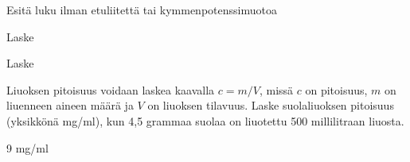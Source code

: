 \begin{tehtavasivu}

\begin{tehtava}
Esitä luku ilman etuliitettä tai kymmenpotenssimuotoa
\begin{alakohdat}
\end{alakohdat}
\begin{vastaus}
\begin{alakohdat}
\end{alakohdat}
\end{vastaus}
\end{tehtava}

\begin{tehtava}
Laske
\begin{alakohdat}
\end{alakohdat}
\begin{vastaus}
\begin{alakohdat}
\end{alakohdat}
\end{vastaus}
\end{tehtava}

\begin{tehtava}
Laske
\begin{alakohdat}
\end{alakohdat}
\begin{vastaus}
\begin{alakohdat}
\end{alakohdat}
\end{vastaus}
\end{tehtava}



\begin{tehtava}
Liuoksen pitoisuus voidaan laskea kaavalla $c=m/V$, missä $c$ on pitoisuus, $m$ on liuenneen aineen määrä ja $V$ on liuoksen tilavuus. Laske suolaliuoksen pitoisuus (yksikkönä mg/ml), kun 4,5 grammaa suolaa on liuotettu 500 millilitraan liuosta.
\begin{vastaus}
9 mg/ml
\end{vastaus}
\end{tehtava}


\end{tehtavasivu}
